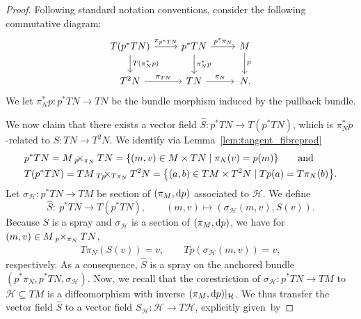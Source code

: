 \documentclass[11pt]{article}
\numberwithin{equation}{section}
\numberwithin{equation}{section}
\newcommand{\cH}{\ensuremath{\mathcal{H}}}
\begin{document}
\begin{proof}
Following standard notation conventions, consider the following commutative diagram:
\begin{displaymath}
\begin{tikzcd}
 T(p^{\ast} TN) \arrow[r, "\pi_{p^\ast TN}"] \arrow[d, "T(\pi_N^\ast p)"] & p^\ast TN \arrow[r,"p^\ast \pi_N"] \arrow[d,"\pi_N^\ast p"] & M \arrow[d,"p"] \\ T^2 N \arrow[r,"\pi_{TN}"] & TN \arrow[r,"\pi_N"] & \,N.
\end{tikzcd}
\end{displaymath}
We let $\pi_N^\ast p \colon p^\ast TN \rightarrow TN$ be the bundle morphism induced by the pullback bundle.

We now claim that there exists a vector field $\hat{S}\colon p^{*}TN \rightarrow T(p^{*}TN)$, which is $\pi^{*}_{N}p$-related to $S\colon TN \rightarrow T^{2}N$.
We identify via Lemma~\ref{lem:tangent_fibreprod}
\begin{align*}
 & p^{*}TN= M \, {}_{p}\hspace{-.5em}\times_{\pi_{N}} TN = \{ (m,v) \in M \times TN \mid \pi_{N}(v) = p(m)\} \qquad \text{and} \\
 & T(p^{*}TN)= TM\, {}_{Tp}\hspace{-.5em}\times_{T\pi_{N}} T^{2}N = \bigl\{ (a,b) \in TM \times T^{2}N \mid Tp(a) = T\pi_{N}(b) \bigr\}.
\end{align*}
Let $\sigma_{\mathcal{H}}\colon p^{*}TN \rightarrow TM$ be section of $(\pi_{M}, {\rm d}p)$ associated to $\mathcal{H}$.
We define
\begin{equation*}
 \hat{S}\colon\ p^{*}TN \rightarrow T(p^{*}TN), \qquad (m,v) \mapsto (\sigma_{\mathcal{H}}(m,v), S(v)).
\end{equation*}
Because $S$ is a spray and $\sigma_{\mathcal{H}}$ is a section of $(\pi_{M},{\rm d}p)$, we have for $(m,v) \in M \, {}_{p}\hspace{-.25em}\times_{\pi_{N}} TN$,
\begin{align*}
 T\pi_{N}(S(v)) = v, \qquad
 Tp(\sigma_{\mathcal{H}}(m,v)) = v,
\end{align*}
respectively.
As a consequence, $\hat{S}$ is a spray on the anchored bundle $(p^\ast\pi_N, p^\ast TN, \sigma_{\cH})$.
Now, we recall that the corestriction of $\sigma_\cH \colon p^\ast TN \rightarrow TM$ to $\mathcal{H} \subseteq TM$ is a diffeomorphism with inverse $(\pi_M,{\rm d}p)|_\cH$.
We thus transfer the vector field $\hat{S}$ to a vector field $S_{\mathcal{H}}\colon \mathcal{H} \rightarrow T\mathcal{H}$, explicitly given~by

\end{proof}
\end{document}
